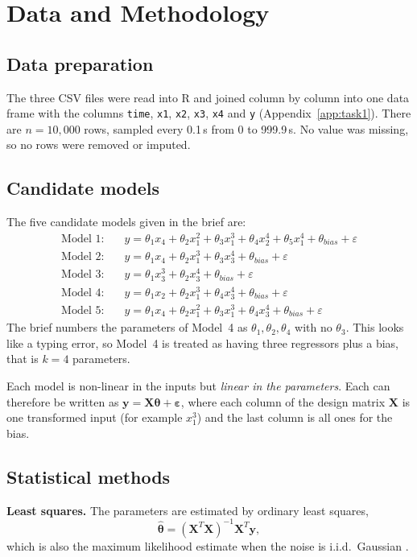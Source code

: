 \section{Data and Methodology}
\label{sec:method}

\subsection{Data preparation}
The three CSV files were read into R and joined column by column into one data frame with the columns \texttt{time}, \texttt{x1}, \texttt{x2}, \texttt{x3}, \texttt{x4} and \texttt{y} (Appendix~\ref{app:task1}). There are $n=10{,}000$ rows, sampled every 0.1\,s from 0 to 999.9\,s. No value was missing, so no rows were removed or imputed.

\subsection{Candidate models}
The five candidate models given in the brief are:
\begin{align*}
\text{Model 1:}\quad & y=\theta_1x_4+\theta_2x_1^2+\theta_3x_1^3+\theta_4x_2^4+\theta_5x_1^4+\theta_{bias}+\varepsilon\\
\text{Model 2:}\quad & y=\theta_1x_4+\theta_2x_1^3+\theta_3x_3^4+\theta_{bias}+\varepsilon\\
\text{Model 3:}\quad & y=\theta_1x_3^3+\theta_2x_3^4+\theta_{bias}+\varepsilon\\
\text{Model 4:}\quad & y=\theta_1x_2+\theta_2x_1^3+\theta_4x_3^4+\theta_{bias}+\varepsilon\\
\text{Model 5:}\quad & y=\theta_1x_4+\theta_2x_1^2+\theta_3x_1^3+\theta_4x_3^4+\theta_{bias}+\varepsilon
\end{align*}
The brief numbers the parameters of Model~4 as $\theta_1,\theta_2,\theta_4$ with no $\theta_3$. This looks like a typing error, so Model~4 is treated as having three regressors plus a bias, that is $k=4$ parameters.

Each model is non-linear in the inputs but \emph{linear in the parameters}. Each can therefore be written as $\mathbf{y}=\mathbf{X}\boldsymbol{\theta}+\boldsymbol{\varepsilon}$, where each column of the design matrix $\mathbf{X}$ is one transformed input (for example $x_1^3$) and the last column is all ones for the bias.

\subsection{Statistical methods}
\textbf{Least squares.} The parameters are estimated by ordinary least squares,
\begin{equation}
\hat{\boldsymbol{\theta}}=(\mathbf{X}^T\mathbf{X})^{-1}\mathbf{X}^T\mathbf{y},
\label{eq:ls}
\end{equation}
which is also the maximum likelihood estimate when the noise is i.i.d.\ Gaussian \citep{montgomery2012}.


